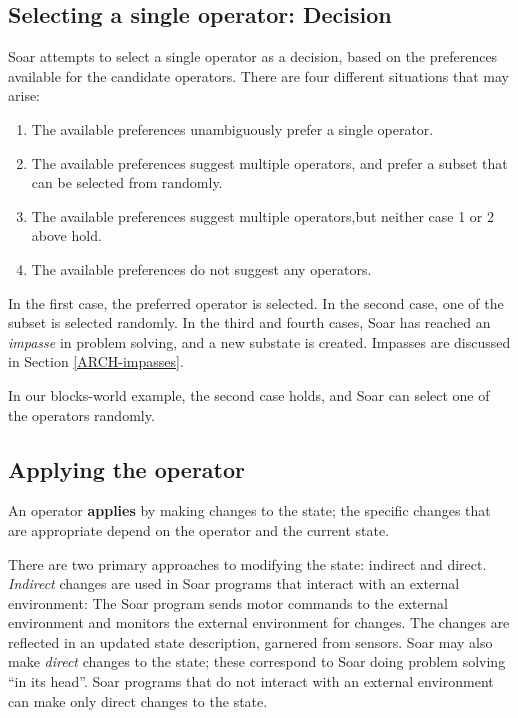 \subsection{Selecting a single operator: Decision}

Soar attempts to select a single operator as a decision, based on the preferences available for the candidate operators. There are four different situations that may arise:

\vspace{-8pt}
\begin{enumerate}
	\item The available preferences unambiguously prefer a single operator.
	\vspace{-6pt}
	\item The available preferences suggest multiple operators, and prefer a subset that can be selected from randomly.
	\vspace{-6pt}
	\item The available preferences suggest multiple operators,but neither case 1 or 2 above hold.
	\vspace{-6pt}
	\item The available preferences do not suggest any operators.
\end{enumerate}

In the first case, the preferred operator is selected.  In the second case, one of the subset is selected randomly. In the third and fourth cases, Soar has reached an \emph{impasse} in problem solving, and a new substate is created.  Impasses are discussed in Section \ref{ARCH-impasses}.

In our blocks-world example, the second case holds, and Soar can select one of the operators randomly.

\subsection{Applying the operator}

An operator \textbf{applies} by making changes to the state; the specific changes that are appropriate depend on the operator and the current state.

There are two primary approaches to modifying the state: indirect and direct. \emph{Indirect} changes are used in Soar programs that interact with an external environment: The Soar program sends motor commands to the external environment and monitors the external environment for changes. The changes are reflected in an updated state description, garnered from sensors. Soar may also make \emph{direct} changes to the state; these correspond to Soar doing problem solving ``in its head''. Soar programs that do not interact with an external environment can make only direct changes to the state.

